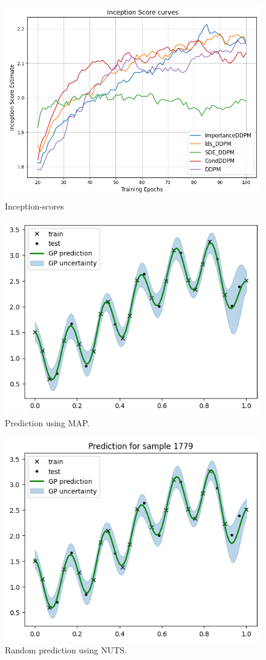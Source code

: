 \begin{figure}[H]
    \centering
    \includegraphics[width=0.9\linewidth]{./figures/Inception.png}
    \caption{Inception-scores}
    \label{fig:ddpm:inception}
\end{figure}




\begin{figure}[H]
  \centering
  \includegraphics[width=.65\textwidth]{./figures/map_pred.png}
  \caption{
    Prediction using MAP.
  }
  \label{fig:gp:map:pred}
\end{figure}
%
\begin{figure}[H]
  \centering
  \includegraphics[width=.65\textwidth]{./figures/nuts_pred.png}
  \caption{
    Random prediction using NUTS.
  }
  \label{fig:gp:nuts:pred}
\end{figure}

